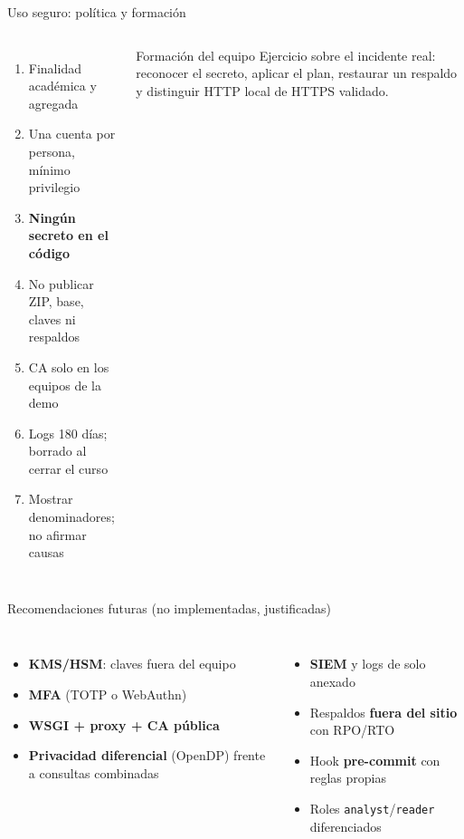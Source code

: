 \documentclass[aspectratio=169,11pt]{beamer}
\begin{document}
\begin{frame}{Uso seguro: política y formación}
\small
\begin{columns}[T,onlytextwidth]
\begin{enumerate}\setlength\itemsep{1pt}
\item Finalidad académica y agregada
\item Una cuenta por persona, mínimo privilegio
\item \textbf{Ningún secreto en el código}
\item No publicar ZIP, base, claves ni respaldos
\item CA solo en los equipos de la demo
\item Logs 180 días; borrado al cerrar el curso
\item Mostrar denominadores; no afirmar causas
\end{enumerate}
\begin{block}{Formación del equipo}
\scriptsize Ejercicio sobre el incidente real: reconocer el secreto, aplicar el plan, restaurar un respaldo y distinguir HTTP local de HTTPS validado.
\end{block}
\end{columns}
\end{frame}

\begin{frame}{Recomendaciones futuras (no implementadas, justificadas)}
\small
\begin{columns}[T,onlytextwidth]
\begin{itemize}\setlength\itemsep{2pt}
\item \textbf{KMS/HSM}: claves fuera del equipo
\item \textbf{MFA} (TOTP o WebAuthn)
\item \textbf{WSGI + proxy + CA pública}
\item \textbf{Privacidad diferencial} (OpenDP) frente a consultas combinadas
\end{itemize}
\begin{itemize}\setlength\itemsep{2pt}
\item \textbf{SIEM} y logs de solo anexado
\item Respaldos \textbf{fuera del sitio} con RPO/RTO
\item Hook \textbf{pre-commit} con reglas propias
\item Roles \texttt{analyst}/\texttt{reader} diferenciados
\end{itemize}
\end{columns}
\end{frame}
\end{document}
